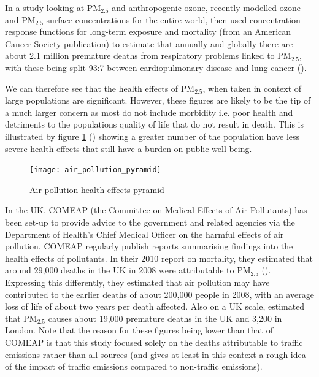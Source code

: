 In a study looking at PM$_{2.5}$ and anthropogenic ozone, \cite{Silva2013} recently modelled ozone and PM$_{2.5}$ surface concentrations for the entire world, then used concentration-response functions for long-term exposure and mortality (from an American Cancer Society publication) to estimate that annually and globally there are about 2.1 million premature deaths from respiratory problems linked to PM$_{2.5}$, with these being split 93:7 between cardiopulmonary disease and lung cancer (\cite{Silva2013}).

We can therefore see that the health effects of PM$_{2.5}$, when taken in context of large populations are significant. However, these figures are likely to be the tip of a much larger concern as most do not include morbidity i.e. poor health and detriments to the populations quality of life that do not result in death. This is illustrated by figure \ref{fig:airpollutionpyramid} (\cite{Mannino2000}) showing a greater number of the population have less severe health effects that still have a burden on public well-being.

\begin{figure}[H]
\centering
\texttt{[image: air\_pollution\_pyramid]}
\caption{Air pollution health effects pyramid}
\label{fig:airpollutionpyramid}
\end{figure}


In the UK, COMEAP (the Committee on Medical Effects of Air Pollutants) has been set-up to provide advice to the government and related agencies via the Department of Health's Chief Medical Officer on the harmful effects of air pollution. COMEAP regularly publish reports summarising findings into the health effects of pollutants. In their 2010 report on mortality, they estimated that around 29,000 deaths in the UK in 2008 were attributable to PM$_{2.5}$ (\cite{CommitteeontheMedicalEffectsofAirPollution2010}). Expressing this differently, they estimated that air pollution may have contributed to the earlier deaths of about 200,000 people in 2008, with an average loss of life of about two years per death affected. Also on a UK scale, \cite{Yim2012} estimated that PM$_{2.5}$ causes about 19,000 premature deaths in the UK and 3,200 in London. Note that the reason for these figures being lower than that of COMEAP is that this study focused solely on the deaths attributable to traffic emissions rather than all sources (and gives at least in this context a rough idea of the impact of traffic emissions compared to non-traffic emissions).


